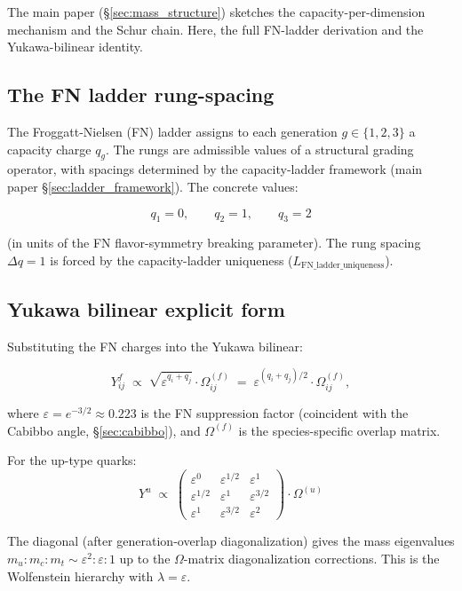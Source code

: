 \documentclass[11pt]{article}
\theoremstyle{definition}
\begin{document}
The main paper (\S\ref{sec:mass_structure}) sketches the capacity-per-dimension mechanism and the Schur chain. Here, the full FN-ladder derivation and the Yukawa-bilinear identity.

\subsection{The FN ladder rung-spacing}\label{sec:FN_rung_spacing}

The Froggatt-Nielsen (FN) ladder assigns to each generation $g \in \{1, 2, 3\}$ a capacity charge $q_g$. The rungs are admissible values of a structural grading operator, with spacings determined by the capacity-ladder framework (main paper \S\ref{sec:ladder_framework}). The concrete values:

\[
q_1 = 0, \qquad q_2 = 1, \qquad q_3 = 2
\]

(in units of the FN flavor-symmetry breaking parameter). The rung spacing $\Delta q = 1$ is forced by the capacity-ladder uniqueness ($L_{\mathrm{FN\_ladder\_uniqueness}}$).

\subsection{Yukawa bilinear explicit form}\label{sec:Yukawa_bilinear_explicit}

Substituting the FN charges into the Yukawa bilinear:

\[
Y_{ij}^f \;\propto\; \sqrt{\varepsilon^{q_i + q_j}} \cdot \Omega_{ij}^{(f)}
\;=\; \varepsilon^{(q_i + q_j)/2} \cdot \Omega_{ij}^{(f)},
\]

where $\varepsilon = e^{-3/2} \approx 0.223$ is the FN suppression factor (coincident with the Cabibbo angle, \S\ref{sec:cabibbo}), and $\Omega^{(f)}$ is the species-specific overlap matrix.

For the up-type quarks:
\[
Y^u \;\propto\;
\begin{pmatrix}
\varepsilon^0 & \varepsilon^{1/2} & \varepsilon^1 \\
\varepsilon^{1/2} & \varepsilon^1 & \varepsilon^{3/2} \\
\varepsilon^1 & \varepsilon^{3/2} & \varepsilon^2
\end{pmatrix}
\cdot \Omega^{(u)}
\]

The diagonal (after generation-overlap diagonalization) gives the mass eigenvalues $m_u : m_c : m_t \sim \varepsilon^2 : \varepsilon : 1$ up to the $\Omega$-matrix diagonalization corrections. This is the Wolfenstein hierarchy with $\lambda = \varepsilon$.
\end{document}
